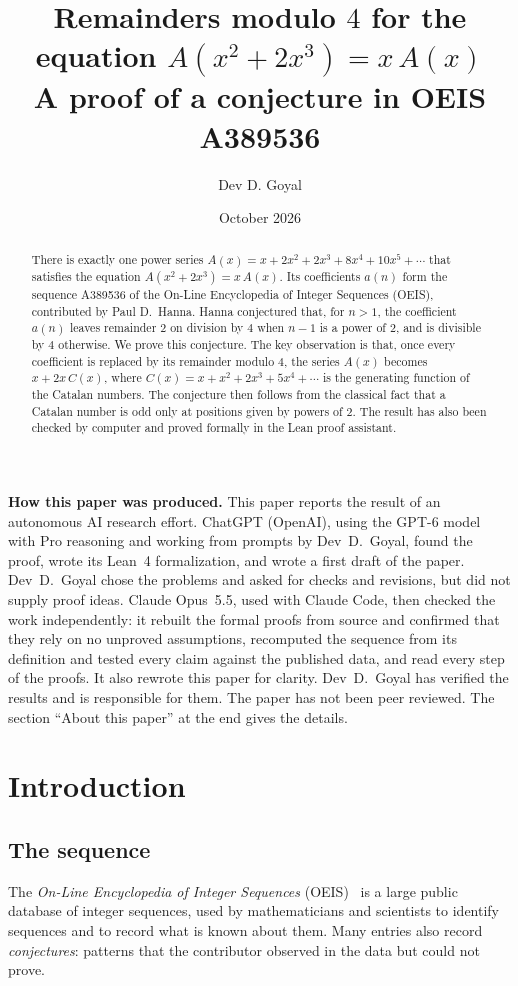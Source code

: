 \documentclass[11pt,a4paper]{article}
\title{Remainders modulo $4$ for the equation $A(x^2+2x^3)=x\,A(x)$\\[6pt]\large A proof of a conjecture in OEIS A389536}
\author{Dev D. Goyal}
\date{October 2026}
\theoremstyle{definition}
\theoremstyle{remark}
\begin{document}
\maketitle
\begin{abstract}
There is exactly one power series $A(x)=x+2x^2+2x^3+8x^4+10x^5+\cdots$ that satisfies the equation
$A(x^2+2x^3)=x\,A(x)$. Its coefficients $a(n)$ form the sequence A389536 of the On-Line Encyclopedia of Integer
Sequences (OEIS), contributed by Paul D.~Hanna. Hanna conjectured that, for $n>1$, the coefficient $a(n)$ leaves
remainder $2$ on division by $4$ when $n-1$ is a power of $2$, and is divisible by $4$ otherwise. We prove this
conjecture. The key observation is that, once every coefficient is replaced by its remainder modulo $4$, the series
$A(x)$ becomes $x+2x\,C(x)$, where $C(x)=x+x^2+2x^3+5x^4+\cdots$ is the generating function of the Catalan numbers.
The conjecture then follows from the classical fact that a Catalan number is odd only at positions given by powers of
$2$. The result has also been checked by computer and proved formally in the Lean proof assistant.
\end{abstract}
\begin{center}\begin{minipage}{0.88\linewidth}\small
\textbf{How this paper was produced.} This paper reports the result of an autonomous AI research effort.
ChatGPT (OpenAI), using the GPT-6 model with Pro reasoning and working from prompts by Dev~D.~Goyal, found the proof, wrote its Lean~4 formalization, and wrote a first draft of the paper.
Dev~D.~Goyal chose the problems and asked for checks and revisions, but did not supply proof ideas.
Claude Opus~5.5, used with Claude Code, then checked the work independently: it rebuilt the formal proofs from
source and confirmed that they rely on no unproved assumptions, recomputed the sequence from its definition and tested
every claim against the published data, and read every step of the proofs. It also rewrote this paper for clarity.
Dev~D.~Goyal has verified the results and is responsible for them. The paper has not been peer reviewed.
The section ``About this paper'' at the end gives the details.
\end{minipage}\end{center}

\section{Introduction}

\subsection{The sequence}\label{sec:sequence}
The \emph{On-Line Encyclopedia of Integer Sequences} (OEIS)~\cite{oeisdb} is a large public database of integer
sequences, used by mathematicians and scientists to identify sequences and to record what is known about them. Many
entries also record \emph{conjectures}: patterns that the contributor observed in the data but could not prove.
\end{document}
